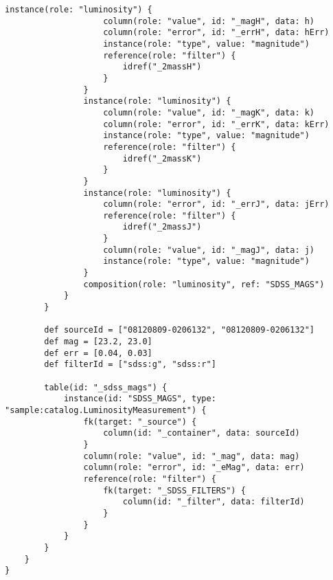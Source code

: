 \documentclass[11pt,a4paper]{ivoa}
\begin{document}
\begin{lstlisting}[label=lst:complex,caption=Full Example VO-DSL listing for complex mapping,frame=tb]
                instance(role: "luminosity") {
                    column(role: "value", id: "_magH", data: h)
                    column(role: "error", id: "_errH", data: hErr)
                    instance(role: "type", value: "magnitude")
                    reference(role: "filter") {
                        idref("_2massH")
                    }
                }
                instance(role: "luminosity") {
                    column(role: "value", id: "_magK", data: k)
                    column(role: "error", id: "_errK", data: kErr)
                    instance(role: "type", value: "magnitude")
                    reference(role: "filter") {
                        idref("_2massK")
                    }
                }
                instance(role: "luminosity") {
                    column(role: "error", id: "_errJ", data: jErr)
                    reference(role: "filter") {
                        idref("_2massJ")
                    }
                    column(role: "value", id: "_magJ", data: j)
                    instance(role: "type", value: "magnitude")
                }
                composition(role: "luminosity", ref: "SDSS_MAGS")
            }
        }

        def sourceId = ["08120809-0206132", "08120809-0206132"]
        def mag = [23.2, 23.0]
        def err = [0.04, 0.03]
        def filterId = ["sdss:g", "sdss:r"]

        table(id: "_sdss_mags") {
            instance(id: "SDSS_MAGS", type: "sample:catalog.LuminosityMeasurement") {
                fk(target: "_source") {
                    column(id: "_container", data: sourceId)
                }
                column(role: "value", id: "_mag", data: mag)
                column(role: "error", id: "_eMag", data: err)
                reference(role: "filter") {
                    fk(target: "_SDSS_FILTERS") {
                        column(id: "_filter", data: filterId)
                    }
                }
            }
        }
    }
}

\end{lstlisting}
\end{document}
